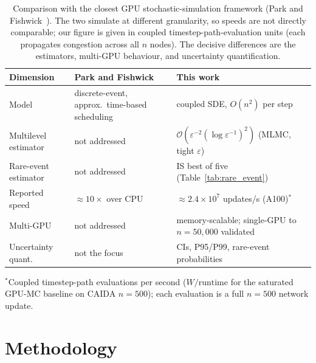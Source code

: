 \documentclass{ieeeaccess}
\begin{document}
\begin{table}[!t]
\caption{Comparison with the closest GPU stochastic-simulation framework
(Park and Fishwick~\cite{park2010gpu}). The two simulate at different granularity, so speeds are
not directly comparable; our figure is given in coupled timestep-path-evaluation units (each
propagates congestion across all $n$ nodes). The decisive differences are the estimators,
multi-GPU behaviour, and uncertainty quantification.}
\label{tab:gpu_comparison}
\centering\small
\begin{tabular}{@{}l l l@{}}
\toprule
Dimension & Park and Fishwick~\cite{park2010gpu} & This work \\
\midrule
Model               & discrete-event, approx.\ time-based scheduling & coupled SDE, $O(n^2)$ per step \\
Multilevel estimator & not addressed                    & $\mathcal{O}(\varepsilon^{-2}(\log\varepsilon^{-1})^2)$ (MLMC, tight $\varepsilon$) \\
Rare-event estimator & not addressed                    & IS best of five (Table~\ref{tab:rare_event}) \\
Reported speed      & ${\approx}10\times$ over CPU       & ${\approx}2.4{\times}10^7$ updates/s (A100)$^\ast$ \\
Multi-GPU           & not addressed                     & memory-scalable; single-GPU to $n{=}50{,}000$ validated \\
Uncertainty quant.\ & not the focus                     & CIs, P95/P99, rare-event probabilities \\
\bottomrule
\end{tabular}
\vspace{2pt}
\parbox{\textwidth}{\footnotesize $^\ast$Coupled timestep-path evaluations per second ($W/\mathrm{runtime}$ for the
saturated GPU-MC baseline on CAIDA $n{=}500$); each evaluation is a full $n{=}500$ network
update.}
\end{table}

\section{Methodology}
\end{document}
